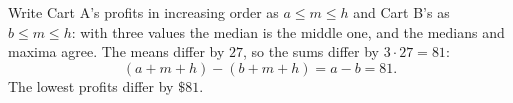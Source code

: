 Write Cart A's profits in increasing order as $a\le m\le h$ and Cart B's as $b\le m\le h$: with three values the median is the middle one, and the medians and maxima agree. The means differ by $27$, so the sums differ by $3\cdot27=81$:
\[
(a+m+h)-(b+m+h)=a-b=81 .
\]
The lowest profits differ by $\boxed{\$81}$.
